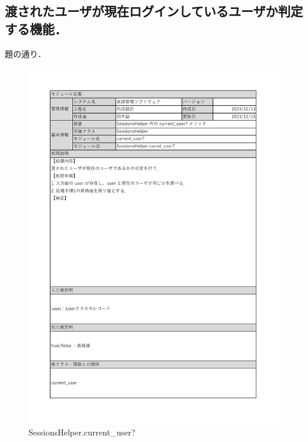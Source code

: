 \subsection*{渡されたユーザが現在ログインしているユーザか判定する機能．}
題の通り．
\begin{figure}[H]
    \centering
    \includegraphics[scale=0.5]{img/Helper/current_user_boolean.pdf}
    \caption{SessionsHelper.current\_user?}
\end{figure}
\clearpage

